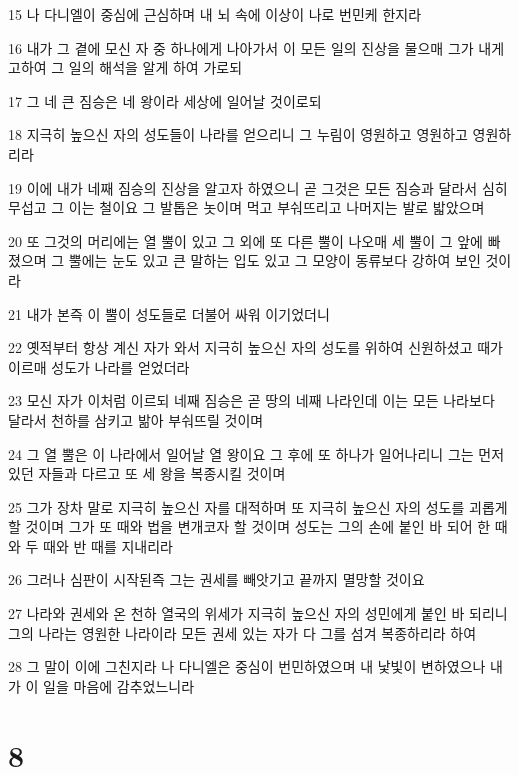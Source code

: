 \par 15 나 다니엘이 중심에 근심하며 내 뇌 속에 이상이 나로 번민케 한지라
\par 16 내가 그 곁에 모신 자 중 하나에게 나아가서 이 모든 일의 진상을 물으매 그가 내게 고하여 그 일의 해석을 알게 하여 가로되
\par 17 그 네 큰 짐승은 네 왕이라 세상에 일어날 것이로되
\par 18 지극히 높으신 자의 성도들이 나라를 얻으리니 그 누림이 영원하고 영원하고 영원하리라
\par 19 이에 내가 네째 짐승의 진상을 알고자 하였으니 곧 그것은 모든 짐승과 달라서 심히 무섭고 그 이는 철이요 그 발톱은 놋이며 먹고 부숴뜨리고 나머지는 발로 밟았으며
\par 20 또 그것의 머리에는 열 뿔이 있고 그 외에 또 다른 뿔이 나오매 세 뿔이 그 앞에 빠졌으며 그 뿔에는 눈도 있고 큰 말하는 입도 있고 그 모양이 동류보다 강하여 보인 것이라
\par 21 내가 본즉 이 뿔이 성도들로 더불어 싸워 이기었더니
\par 22 옛적부터 항상 계신 자가 와서 지극히 높으신 자의 성도를 위하여 신원하셨고 때가 이르매 성도가 나라를 얻었더라
\par 23 모신 자가 이처럼 이르되 네째 짐승은 곧 땅의 네째 나라인데 이는 모든 나라보다 달라서 천하를 삼키고 밞아 부숴뜨릴 것이며
\par 24 그 열 뿔은 이 나라에서 일어날 열 왕이요 그 후에 또 하나가 일어나리니 그는 먼저 있던 자들과 다르고 또 세 왕을 복종시킬 것이며
\par 25 그가 장차 말로 지극히 높으신 자를 대적하며 또 지극히 높으신 자의 성도를 괴롭게 할 것이며 그가 또 때와 법을 변개코자 할 것이며 성도는 그의 손에 붙인 바 되어 한 때와 두 때와 반 때를 지내리라
\par 26 그러나 심판이 시작된즉 그는 권세를 빼앗기고 끝까지 멸망할 것이요
\par 27 나라와 권세와 온 천하 열국의 위세가 지극히 높으신 자의 성민에게 붙인 바 되리니 그의 나라는 영원한 나라이라 모든 권세 있는 자가 다 그를 섬겨 복종하리라 하여
\par 28 그 말이 이에 그친지라 나 다니엘은 중심이 번민하였으며 내 낯빛이 변하였으나 내가 이 일을 마음에 감추었느니라

\chapter{8}

